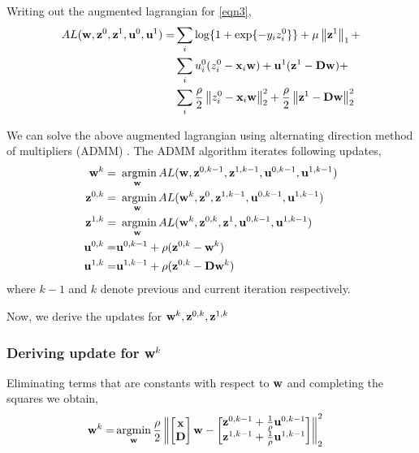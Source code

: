 \documentclass[conference,10pt,draftclsnofoot,onecolumn]{IEEEtran}
\begin{document}
Writing out the augmented lagrangian for \eqref{eqn3},
\begin{align}
\label{eqn4}
AL(\ww, \zz^0, \zz^1, \uu^0, \uu^1) = & \sum_i \log\{1+\exp\{-y_{i}z_{i}^{0}\}\} + \mu\nrmo{\zz^1} + \notag \\
& \sum_{i} u_{i}^{0} (z_{i}^{0} - \xx_{i}\ww) + \uu^{1} (\zz^{1} - \DD\ww) + \\
& \sum_{i} \frac{\rho}{2} \nrmt{z_{i}^{0} - \xx_{i}\ww}^{2} + \frac{\rho}{2} \nrmt{\zz^{1} - \DD\ww}^{2} \notag
\end{align}

We can solve the above augmented lagrangian using alternating direction method of multipliers (ADMM) \cite{jojic12}. The ADMM algorithm
iterates following updates,
\begin{align}
    \label{eqn5}
    \ww^k = & \mathop{\textrm{ argmin}}_\ww AL(\ww, \zz^{0, k-1}, \zz^{1, k-1}, \uu^{0, k-1}, \uu^{1, k-1}) \notag\\
    \zz^{0, k} = & \mathop{\textrm{ argmin}}_\ww AL(\ww^k, \zz^{0}, \zz^{1, k-1}, \uu^{0, k-1}, \uu^{1, k-1})\notag\\
    \zz^{1, k} = & \mathop{\textrm{ argmin}}_\ww AL(\ww^k, \zz^{0, k}, \zz^{1}, \uu^{0, k-1}, \uu^{1, k-1}) \\
    \uu^{0, k} = & \uu^{0, k-1} + \rho (\zz^{0, k} - \ww^k) \notag\\
    \uu^{1, k} = & \uu^{1, k-1} + \rho (\zz^{0, k} - \DD\ww^k)\notag
\end{align}
where $k - 1$ and $k$ denote previous and current iteration respectively.

Now, we derive the updates for $\mathbf{w}^k, \mathbf{z}^{0, k}, \mathbf{z}^{1, k}$

\subsubsection{Deriving update for \textbf{w}$^k$}
\label{subsubsec:wupdate}
Eliminating terms that are constants with respect to $\mathbf{w}$ and completing the squares we obtain,
\begin{align}
\label{eqn6}
\ww^k =& \argmin_\ww \frac{\rho}{2} \nrmt{\begin{bmatrix} \xx \\ \DD \end{bmatrix}\ww - \begin{bmatrix} \zz^{0,k-1} + \frac{1}{\rho} \uu^{0, k-1} \\ \zz^{1,k-1} + \frac{1}{\rho} \uu^{1, k-1} \end{bmatrix} }^{2} 
\end{align}
\end{document}
